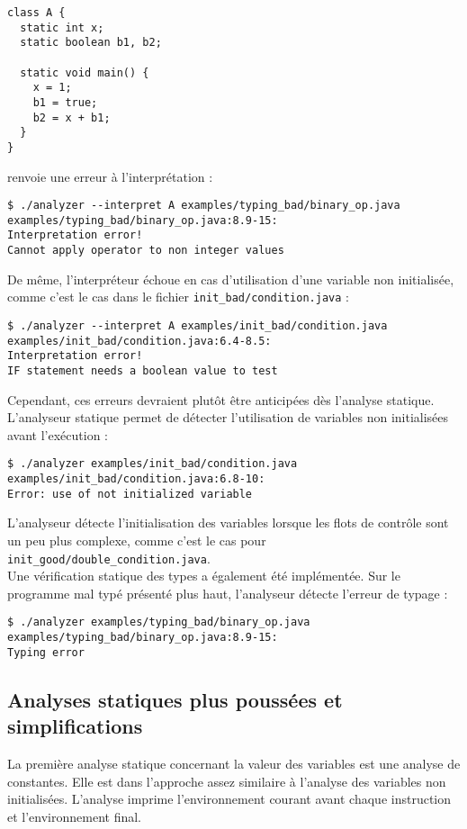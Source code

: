 \documentclass[paper=a4, fontsize=11pt]{scrartcl}
\numberwithin{figure}{section}			%
\numberwithin{table}{section}				%
\begin{document}
\begin{verbatim}
class A {
  static int x;
  static boolean b1, b2;

  static void main() {
    x = 1;
    b1 = true;
    b2 = x + b1;
  }
}
\end{verbatim}

renvoie une erreur à l'interprétation :

\begin{verbatim}
$ ./analyzer --interpret A examples/typing_bad/binary_op.java
examples/typing_bad/binary_op.java:8.9-15:
Interpretation error!
Cannot apply operator to non integer values
\end{verbatim}

De même, l'interpréteur échoue en cas d'utilisation d'une variable non initialisée, comme c'est le cas dans le fichier \texttt{init\_bad/condition.java} :

\begin{verbatim}
$ ./analyzer --interpret A examples/init_bad/condition.java
examples/init_bad/condition.java:6.4-8.5:
Interpretation error!
IF statement needs a boolean value to test
\end{verbatim}

Cependant, ces erreurs devraient plutôt être anticipées dès l'analyse statique. L'analyseur statique permet de détecter l'utilisation de variables non initialisées avant l'exécution :

\begin{verbatim}
$ ./analyzer examples/init_bad/condition.java
examples/init_bad/condition.java:6.8-10:
Error: use of not initialized variable
\end{verbatim}

L'analyseur détecte l'initialisation des variables lorsque les flots de contrôle sont un peu plus complexe, comme c'est le cas pour \texttt{init\_good/double\_condition.java}.\\

Une vérification statique des types a également été implémentée. Sur le programme mal typé présenté plus haut, l'analyseur détecte l'erreur de typage :

\begin{verbatim}
$ ./analyzer examples/typing_bad/binary_op.java
examples/typing_bad/binary_op.java:8.9-15:
Typing error
\end{verbatim}

\subsection{Analyses statiques plus poussées et simplifications}

La première analyse statique concernant la valeur des variables est une analyse de constantes. Elle est dans l'approche assez similaire à l'analyse des variables non initialisées. L'analyse imprime l'environnement courant avant chaque instruction et l'environnement final.
\end{document}
